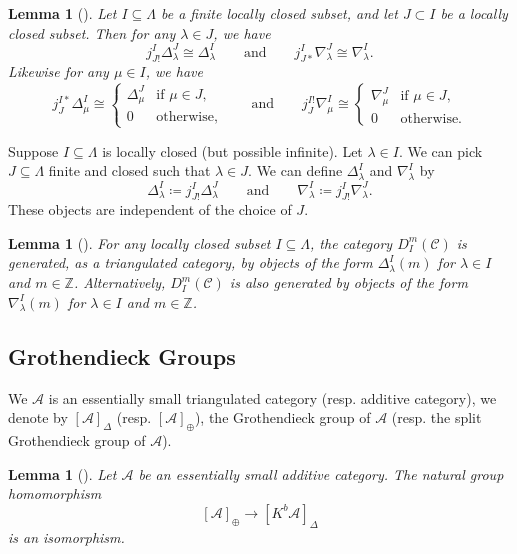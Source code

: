 \documentclass{amsart}
\newcommand{\Z}{\mathbb{Z}}
\newcommand{\scrC}{\mathcal{C}}
\newcommand{\scrA}{\mathcal{A}}
\newtheorem{lemma}[subsubsection]{Lemma}
\theoremstyle{definition}
\numberwithin{equation}{subsection}
\begin{document}
\begin{lemma}[{\cite[Lemma 6.8]{ARV}}]\label{lem:pushforwards_and_pullbacks_of_stds}
    Let $I \subseteq \Lambda$ be a finite locally closed subset, and let $J \subset I$ be a locally closed subset.
    Then for any $\lambda \in J$, we have
    \[j_{J!}^I \Delta_{\lambda}^J \cong \Delta_{\lambda}^I \qquad\text{and}\qquad j_{J*}^I \nabla_{\lambda}^J \cong \nabla_{\lambda}^I. \]
    Likewise for any $\mu \in I$, we have
    \[j_J^{I*} \Delta_{\mu}^I \cong \begin{cases} \Delta_{\mu}^J & \text{if } \mu \in J, \\ 0 & \text{otherwise,}\end{cases} \qquad\text{and}\qquad j_J^{I!} \nabla_{\mu}^I \cong \begin{cases} \nabla_{\mu}^J & \text{if } \mu \in J, \\ 0 & \text{otherwise.}\end{cases}\]
\end{lemma}

Suppose $I \subseteq \Lambda$ is locally closed (but possible infinite). 
Let $\lambda \in I$. We can pick $J \subseteq \Lambda$ finite and closed such that $\lambda \in J$.
We can define $\Delta_{\lambda}^I$ and $\nabla_{\lambda}^I$ by
\[\Delta_{\lambda}^I \coloneq j_{J !}^I \Delta_{\lambda}^J \qquad\text{and}\qquad \nabla_{\lambda}^I \coloneq j_{J !}^I \nabla_{\lambda}^J.\]
These objects are independent of the choice of $J$.

\begin{lemma}[{\cite[Lemma 6.9]{ARV}}]\label{lem:stds_generate}
    For any locally closed subset $I \subseteq \Lambda$, the category $D_I^m (\scrC)$ is generated, as a triangulated category, by objects of the form $\Delta_{\lambda}^I (m)$ for $\lambda \in I$ and $m \in \Z$.
    Alternatively, $D_I^m (\scrC)$ is also generated by objects of the form $\nabla_{\lambda}^I (m)$ for $\lambda \in I$ and $m \in \Z$.
\end{lemma}

\subsection{Grothendieck Groups}

We $\scrA$ is an essentially small triangulated category (resp. additive category), we denote by $[\scrA]_{\Delta}$ (resp. $[\scrA]_{\oplus}$), the Grothendieck group of $\scrA$ (resp. the split Grothendieck group of $\scrA$).

\begin{lemma}[{\cite[Theorem 1.1]{Rose}}]\label{lem:red_to_tri_groth_gps}
    Let $\scrA$ be an essentially small additive category. The natural group homomorphism
    \[[\scrA]_{\oplus} \to [K^b \scrA]_{\Delta}\]
    is an isomorphism.
\end{lemma}
\end{document}
